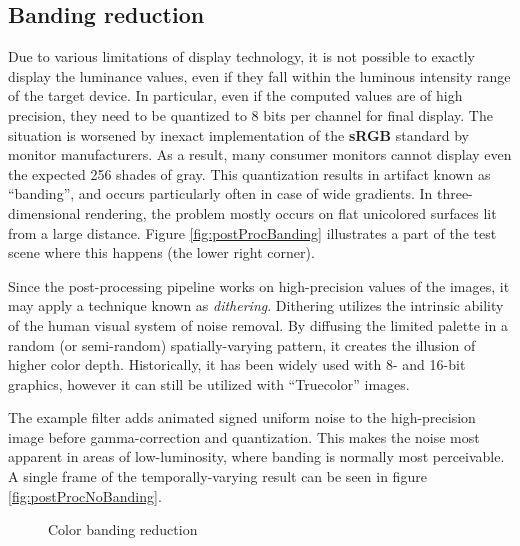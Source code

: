 \subsection{Banding reduction}

Due to various limitations of display technology, it is not possible to exactly display the luminance values, even if they fall within the luminous intensity range of the target device. In particular, even if the computed values are of high precision, they need to be quantized to 8 bits per channel for final display. The situation is worsened by inexact implementation of the \textbf{sRGB} standard by monitor manufacturers. As a result, many consumer monitors cannot display even the expected 256 shades of gray. This quantization results in artifact known as ``banding'', and occurs particularly often in case of wide gradients. In three-dimensional rendering, the problem mostly occurs on flat unicolored surfaces lit from a large distance. Figure \ref{fig:postProcBanding} illustrates a part of the test scene where this happens (the lower right corner).

Since the post-processing pipeline works on high-precision values of the images, it may apply a technique known as \emph{dithering}. Dithering utilizes the intrinsic ability of the human visual system of noise removal. By diffusing the limited palette in a random (or semi-random) spatially-varying pattern, it creates the illusion of higher color depth. Historically, it has been widely used with 8- and 16-bit graphics, however it can still be utilized with ``Truecolor'' images.

The example filter adds animated signed uniform noise to the high-precision image before gamma-correction and quantization. This makes the noise most apparent in areas of low-luminosity, where banding is normally most perceivable. A single frame of the temporally-varying result can be seen in figure \ref{fig:postProcNoBanding}.

\begin{figure}[h!]
  \centering
  \caption[Color banding reduction]{Color banding reduction}
  \label{fig:postProcBandingNoBanding}
\end{figure}
